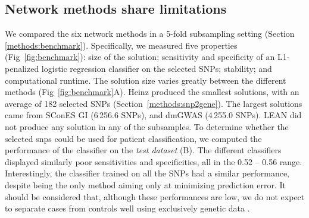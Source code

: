 \documentclass[10pt,letterpaper]{article}
\begin{document}
\subsection{Network methods share limitations}
\label{results:benchmark}

We compared the six network methods in a 5-fold subsampling setting (Section \ref{methods:benchmark}). Specifically, we measured five properties (Fig~\ref{fig:benchmark}): size of the solution; sensitivity and specificity of an L1-penalized logistic regression classifier on the selected SNPs; stability; and computational runtime. The solution size varies greatly between the different methods (Fig~\ref{fig:benchmark}A). Heinz produced the smallest solutions, with an average of 182 selected SNPs (Section~\ref{methods:snp2gene}). The largest solutions came from SConES GI (6\,256.6 SNPs), and dmGWAS (4\,255.0 SNPs). LEAN did not produce any solution in any of the subsamples. To determine whether the selected snps could be used for patient classification, we computed the performance of the classifier on the \emph{test dataset} (B). The different classifiers displayed similarly poor sensitivities and specificities, all in the 0.52 -- 0.56 range. Interestingly, the classifier trained on all the SNPs had a similar performance, despite being the only method aiming only at minimizing prediction error. It should be considered that, although these performances are low, we do not expect to separate cases from controls well using exclusively genetic data \cite{deloscamposComplexTraitPredictionEra2018}.
\end{document}
